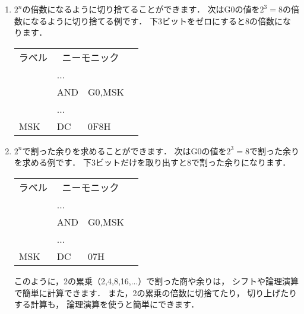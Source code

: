 \begin{enumerate}
  \begin{center}
  \end{center}

\item $2^n$の倍数になるように切り捨てることができます．
  次はG0の値を$2^3=8$の倍数になるように切り捨てる例です．
  下3ビットをゼロにすると8の倍数になります．

  {\small\ttfamily\begin{center}
    \begin{tabular}{|l|l l|l}
      \cline{1-3}
      ラベル & \multicolumn{2}{|c|}{ニーモニック} & \\
      \cline{1-3}
      & ...  &        & \\
      & AND  & G0,MSK & \\
      & ...  &        & \\
      MSK & DC   & 0F8H   & \\
      \cline{1-3}
    \end{tabular}
  \end{center}}

\item $2^n$で割った余りを求めることができます．
  次はG0の値を$2^3=8$で割った余りを求める例です．
  下3ビットだけを取り出すと8で割った余りになります．

  \begin{center}
    {\small\ttfamily
      \begin{tabular}{|l|l l|l}
        \cline{1-3}
        ラベル & \multicolumn{2}{|c|}{ニーモニック} & \\
        \cline{1-3}
        & ...  &        & \\
        & AND  & G0,MSK & \\
        & ...  &        & \\
        MSK & DC   & 07H    & \\
        \cline{1-3}
      \end{tabular}
    }
  \end{center}

  \vspace{1ex}
  このように，2の累乗（2,4,8,16,...）で割った商や余りは，
  シフトや論理演算で簡単に計算できます．
  また，2の累乗の倍数に切捨てたり，
  切り上げたりする計算も，
  論理演算を使うと簡単にできます．

\end{enumerate}

